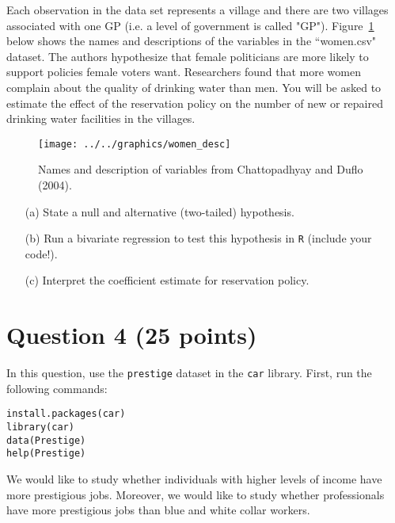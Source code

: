 \documentclass[12pt,letterpaper]{article}
\begin{document}
\noindent Each observation in the data set represents a village and there are two villages associated with one GP (i.e. a level of government is called "GP"). Figure~\ref{fig:women_desc} below shows the names and descriptions of the variables in the ``women.csv" dataset. The authors hypothesize that female politicians are more likely to support policies female voters want. Researchers found that more women complain about the quality of drinking water than men. You will be asked to estimate the effect of the reservation policy on the number of new or repaired drinking water facilities in the villages.
			\vspace{.5cm}
\begin{figure}[h!]
	\caption{\footnotesize{Names and description of variables from Chattopadhyay and Duflo (2004).}}
	\centering
	\label{fig:women_desc}
	\texttt{[image: ../../graphics/women\_desc]}
\end{figure}		

\newpage
\begin{enumerate}
	\item [(a)] State a null and alternative (two-tailed) hypothesis. 

\vspace{6cm}
	\item [(b)] Run a bivariate regression to test this hypothesis in \texttt{R} (include your code!).

\vspace{6cm}
\item [(c)] Interpret the coefficient estimate for reservation policy. 
\end{enumerate}

\newpage		
	\section*{Question 4 (25 points)}
	
In this question, use the \texttt{prestige} dataset in the \texttt{car} library. First, run the following commands:

\begin{verbatim}
install.packages(car)
library(car)
data(Prestige)
help(Prestige)
\end{verbatim} 


\noindent We would like to study whether individuals with higher levels of income have more prestigious jobs. Moreover, we would like to study whether professionals have more prestigious jobs than blue and white collar workers.
\end{document}
